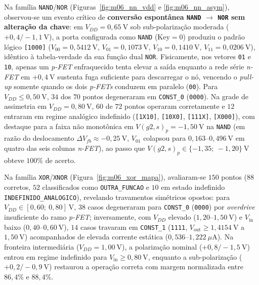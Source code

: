 Na fam\'{i}lia \texttt{NAND}/\texttt{NOR} (Figuras~\ref{fig:m06_nn_vdd} e \ref{fig:m06_nn_asym}), observou-se um evento cr\'{i}tico de \textbf{convers\~{a}o espont\^{a}nea \texttt{NAND} $\to$ \texttt{NOR} sem altera\c{c}\~{a}o da chave}: em $V_{DD} = 0{,}65\ \text{V}$ sob sub-polariza\c{c}\~{a}o moderada ($+0{,}4/-1{,}1\ \text{V}$), a porta configurada como \texttt{NAND} ($\text{Key}=0$) produziu o padr\~{a}o l\'{o}gico \texttt{[1000]} ($V_{00}=0{,}5412\ \text{V}$, $V_{01}=0{,}1073\ \text{V}$, $V_{10}=0{,}1410\ \text{V}$, $V_{11}=0{,}0206\ \text{V}$), id\^{e}ntico \`{a} tabela-verdade da sua fun\c{c}\~{a}o dual \texttt{NOR}. Fisicamente, nos vetores \texttt{01} e \texttt{10}, apenas um \textit{p-FET} enfraquecido tenta elevar a sa\'{i}da enquanto a rede s\'{e}rie \textit{n-FET} em $+0{,}4\ \text{V}$ sustenta fuga suficiente para descarregar o n\'{o}, vencendo o \textit{pull-up} somente quando os dois \textit{p-FETs} conduzem em paralelo (\texttt{00}). Para $V_{DD} \le 0{,}50\ \text{V}$, $34$ dos $70$ pontos degeneraram em \texttt{CONST\_0} (\texttt{0000}). Na grade de assimetria em $V_{DD}=0{,}80\ \text{V}$, $60$ de $72$ pontos operaram corretamente e $12$ entraram em regime anal\'{o}gico indefinido (\texttt{[1X10]}, \texttt{[10X0]}, \texttt{[111X]}, \texttt{[X000]}), com destaque para a faixa n\~{a}o monot\^{o}nica em $V(g2,s)_p = -1{,}50\ \text{V}$ na \texttt{NAND} (em raz\~{a}o do deslocamento $\Delta V_{fb} \approx -0{,}25\ \text{V}$, $V_{01}$ colapsou para $0{,}163\text{--}0{,}496\ \text{V}$ em quatro das seis colunas \textit{n-FET}), ao passo que $V(g2,s)_p \in \{-1{,}35;\ -1{,}20\}\ \text{V}$ obteve $100\%$ de acerto.

Na fam\'{i}lia \texttt{XOR}/\texttt{XNOR} (Figura~\ref{fig:m06_xor_mapa}), avaliaram-se $150$ pontos ($88$ corretos, $52$ classificados como \texttt{OUTRA\_\allowbreak FUNCAO} e $10$ em estado indefinido \texttt{INDEFINIDO\_\allowbreak ANALOGICO}), revelando travamentos sim\'{e}tricos opostos: para $V_{DD} \in [0{,}60;\ 0{,}80]\ \text{V}$, $38$ casos degeneraram para \texttt{CONST\_0} (\texttt{0000}) por \textit{overdrive} insuficiente do ramo \textit{p-FET}; inversamente, com $V_{DD}$ elevado ($1{,}20\text{--}1{,}50\ \text{V}$) e $V_{\mathrm{in}}$ baixo ($0{,}40\text{--}0{,}60\ \text{V}$), $14$ casos travaram em \texttt{CONST\_1} (\texttt{1111}, $V_{\mathrm{out}} \ge 1{,}4154\ \text{V}$ a $1{,}50\ \text{V}$) acompanhados de elevada corrente est\'{a}tica ($0{,}536\text{--}1{,}222\ \mu\text{A}$). Na fronteira intermedi\'{a}ria ($V_{DD} = 1{,}00\ \text{V}$), a polariza\c{c}\~{a}o nominal ($+0{,}8/-1{,}5\ \text{V}$) entrou em regime indefinido para $V_{\mathrm{in}} \ge 0{,}80\ \text{V}$, enquanto a sub-polariza\c{c}\~{a}o ($+0{,}2/-0{,}9\ \text{V}$) restaurou a opera\c{c}\~{a}o correta com margem normalizada entre $86{,}4\%$ e $88{,}4\%$.


